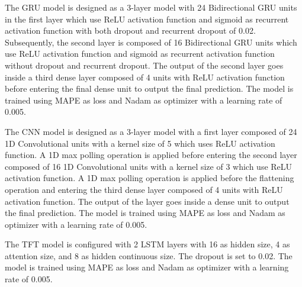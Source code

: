 The GRU model is designed as a 3-layer model with 24 Bidirectional GRU units in the first layer which use ReLU activation function and sigmoid as recurrent activation function with both dropout and recurrent dropout of 0.02.
Subsequently, the second layer is composed of 16 Bidirectional GRU units which use ReLU activation function and sigmoid as recurrent activation function without dropout and recurrent dropout.
The output of the second layer goes inside a third dense layer composed of 4 units with ReLU activation function before entering the final dense unit to output the final prediction.
The model is trained using MAPE as loss and Nadam as optimizer with a learning rate of 0.005.

The CNN model is designed as a 3-layer model with a first layer composed of 24 1D Convolutional units with a kernel size of 5 which uses ReLU activation function.
A 1D max polling operation is applied before entering the second layer composed of 16 1D Convolutional units with a kernel size of 3 which use ReLU activation function.
A 1D max polling operation is applied before the flattening operation and entering the third dense layer composed of 4 units with ReLU activation function.
The output of the layer goes inside a dense unit to output the final prediction.
The model is trained using MAPE as loss and Nadam as optimizer with a learning rate of 0.005.

The TFT model is configured with 2 LSTM layers with 16 as hidden size, 4 as attention size, and 8 as hidden continuous size.
The dropout is set to 0.02.
The model is trained using MAPE as loss and Nadam as optimizer with a learning rate of 0.005.

